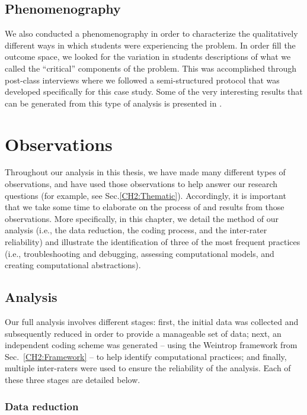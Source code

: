 \documentclass{msuphddissertation}
\begin{document}
\begin{doublespace}
\section{Phenomenography}\label{Sec:Phenom}

We also conducted a phenomenography in order to characterize the qualitatively different ways in which students were experiencing the problem.  In order fill the outcome space, we looked for the variation in students descriptions of what we called the ``critical'' components of the problem.  This was accomplished through post-class interviews where we followed a semi-structured protocol that was developed specifically for this case study.  Some of the very interesting results that can be generated from this type of analysis is presented in \cite{Hawkins2017}.

%
%
%
%
%
%
%
%
%
%
%
%
%
%
%
%

\chapter{Observations}\label{CH5:Observations}

Throughout our analysis in this thesis, we have made many different types of observations, and have used those observations to help answer our research questions (for example, see Sec.\ref{CH2:Thematic}).  Accordingly, it is important that we take some time to elaborate on the process of and results from those observations.  More specifically, in this chapter, we detail the method of our analysis (i.e., the data reduction, the coding process, and the inter-rater reliability) and illustrate the identification of three of the most frequent practices (i.e., troubleshooting and debugging, assessing computational models, and creating computational abstractions).

\section{Analysis}

Our full analysis involves different stages: first, the initial data was collected and subsequently reduced in order to provide a manageable set of data; next, an independent coding scheme was generated -- using the Weintrop framework from Sec.~\ref{CH2:Framework} -- to help identify computational practices; and finally, multiple inter-raters were used to ensure the reliability of the analysis.  Each of these three stages are detailed below.

\subsection{Data reduction}


\end{doublespace}
\end{document}
